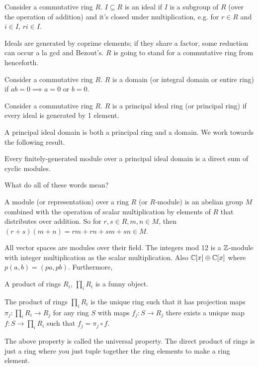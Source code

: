\begin{definition}
    Consider a commutative ring $R$. $I \subseteq R$ is an ideal if $I$ is a subgroup of $R$ (over the operation of addition) and it's closed under multiplication, e.g.
    for $r \in R$ and $i \in I$, $ri \in I$.
\end{definition}
Ideals are generated by coprime elements; if they share a factor, some reduction can occur a la gcd and Bezout's.
$R$ is going to stand for a commutative ring from henceforth.
\begin{definition}
    Consider a commutative ring $R$. $R$ is a domain (or integral domain or entire ring) if $ab = 0 \implies a = 0 \text{ or } b = 0$.
\end{definition}
\begin{definition}
    Consider a commutative ring $R$. $R$ is a principal ideal ring (or principal ring) if every ideal is generated by 1 element.
\end{definition}
A principal ideal domain is both a principal ring and a domain.
We work towards the following result.
\begin{theorem}
    Every finitely-generated module over a principal ideal domain is a direct sum of cyclic modules.
\end{theorem}
What do all of these words mean?
\begin{definition}
    A module (or representation) over a ring $R$ (or $R$-module) is an abelian group $M$ combined with the operation
    of scalar multiplication by elements of $R$ that distributes over addition. So for $r,s \in R, m,n \in M$, then $(r+s)(m + n) = rm + rn + sm + sn \in M$.
\end{definition}
All vector spaces are modules over their field. The integers mod 12 is a $\operatorname{\mathbb{Z}}$-module with integer multiplication
as the scalar multiplication. Also $\operatorname{\mathbb{C}}[x] \oplus \operatorname{\mathbb{C}}[x]$ where $p (a, b) = (pa, pb)$. Furthermore, 

A product of rings $R_i$, $\prod_i R_i$ is a funny object.
\begin{definition}
    The product of rings $\prod_i R_i$ is the unique ring such that it has projection maps $\pi_j: \prod_i R_i \to R_j$ for any ring $S$ with maps $f_j: S \to R_j$ there exists a unique
    map $f: S \to \prod_i R_i$ such that $f_j = \pi_j \circ f$.
\end{definition}
The above property is called the universal property. The direct product of rings is just a ring where you just tuple together the ring elements to make a ring element.


